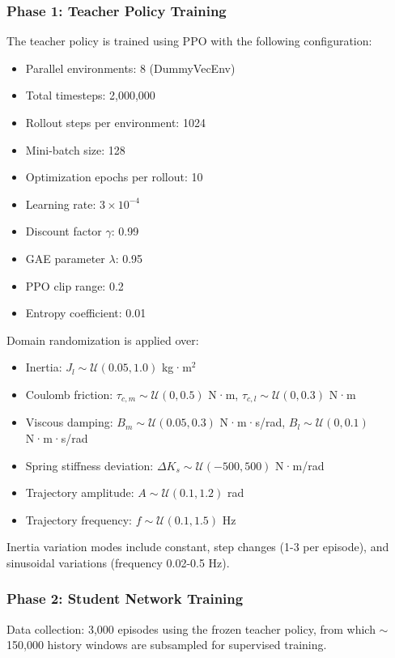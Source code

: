 \documentclass[lettersize,journal]{IEEEtran}
\begin{document}
\subsubsection{Phase 1: Teacher Policy Training}

The teacher policy is trained using PPO with the following configuration:
\begin{itemize}
\item Parallel environments: 8 (DummyVecEnv)
\item Total timesteps: 2,000,000
\item Rollout steps per environment: 1024
\item Mini-batch size: 128
\item Optimization epochs per rollout: 10
\item Learning rate: $3 \times 10^{-4}$
\item Discount factor $\gamma$: 0.99
\item GAE parameter $\lambda$: 0.95
\item PPO clip range: 0.2
\item Entropy coefficient: 0.01
\end{itemize}

Domain randomization is applied over:
\begin{itemize}
\item Inertia: $J_l \sim \mathcal{U}(0.05, 1.0)$ kg·m$^2$
\item Coulomb friction: $\tau_{c,m} \sim \mathcal{U}(0, 0.5)$ N·m, $\tau_{c,l} \sim \mathcal{U}(0, 0.3)$ N·m
\item Viscous damping: $B_m \sim \mathcal{U}(0.05, 0.3)$ N·m·s/rad, $B_l \sim \mathcal{U}(0, 0.1)$ N·m·s/rad
\item Spring stiffness deviation: $\Delta K_s \sim \mathcal{U}(-500, 500)$ N·m/rad
\item Trajectory amplitude: $A \sim \mathcal{U}(0.1, 1.2)$ rad
\item Trajectory frequency: $f \sim \mathcal{U}(0.1, 1.5)$ Hz
\end{itemize}

Inertia variation modes include constant, step changes (1-3 per episode), and sinusoidal variations (frequency 0.02-0.5 Hz).

\subsubsection{Phase 2: Student Network Training}

Data collection: 3,000 episodes using the frozen teacher policy, from which $\sim$150,000 history windows are subsampled for supervised training.
\end{document}
